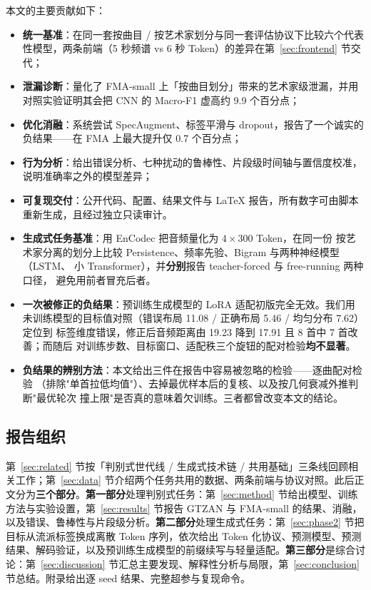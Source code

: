 \documentclass[UTF8,10pt,a4paper]{ctexart}
\begin{document}
本文的主要贡献如下：
\begin{itemize}
  \item \textbf{统一基准}：在同一套按曲目 / 按艺术家划分与同一套评估协议下比较六个代表性模型，两条前端（5 秒频谱 vs 6 秒 Token）的差异在第~\ref{sec:frontend} 节交代；
  \item \textbf{泄漏诊断}：量化了 FMA-small 上「按曲目划分」带来的艺术家级泄漏，并用对照实验证明其会把 CNN 的 Macro-F1 虚高约 9.9 个百分点；
  \item \textbf{优化消融}：系统尝试 SpecAugment、标签平滑与 dropout，报告了一个诚实的负结果——在 FMA 上最大提升仅 0.7 个百分点；
  \item \textbf{行为分析}：给出错误分析、七种扰动的鲁棒性、片段级时间轴与置信度校准，说明准确率之外的模型差异；
  \item \textbf{可复现交付}：公开代码、配置、结果文件与 LaTeX 报告，所有数字可由脚本重新生成，且经过独立只读审计。
  \item \textbf{生成式任务基准}：用 EnCodec 把音频量化为 $4\times300$ Token，在同一份
        按艺术家分离的划分上比较 Persistence、频率先验、Bigram 与两种神经模型（LSTM、
        小 Transformer），并\textbf{分别}报告 teacher-forced 与 free-running 两种口径，
        避免用前者冒充后者。
  \item \textbf{一次被修正的负结果}：预训练生成模型的 LoRA 适配初版完全无效。我们用
        未训练模型的目标值对照（错误布局 11.08 / 正确布局 5.46 / 均匀分布 7.62）定位到
        标签维度错误，修正后音频距离由 19.23 降到 17.91 且 8 首中 7 首改善；而随后
        对训练步数、目标窗口、适配秩三个旋钮的配对检验\textbf{均不显著}。
  \item \textbf{负结果的辨别方法}：本文给出三件在报告中容易被忽略的检验——逐曲配对检验
        （排除"单首拉低均值"）、去掉最优样本后的复核、以及按几何衰减外推判断"最优轮次
        撞上限"是否真的意味着欠训练。三者都曾改变本文的结论。
\end{itemize}

\subsection{报告组织}

第~\ref{sec:related} 节按「判别式世代线 / 生成式技术链 / 共用基础」三条线回顾相关工作；第~\ref{sec:data} 节介绍两个任务共用的数据、两条前端与协议对照。此后正文分为\textbf{三个部分}。\textbf{第一部分}处理判别式任务：第~\ref{sec:method} 节给出模型、训练方法与实验设置，第~\ref{sec:results} 节报告 GTZAN 与 FMA-small 的结果、消融，以及错误、鲁棒性与片段级分析。\textbf{第二部分}处理生成式任务：第~\ref{sec:phase2} 节把目标从流派标签换成离散 Token 序列，依次给出 Token 化协议、预测模型、预测结果、解码验证，以及预训练生成模型的前缀续写与轻量适配。\textbf{第三部分}是综合讨论：第~\ref{sec:discussion} 节汇总主要发现、解释性分析与局限，第~\ref{sec:conclusion} 节总结。附录给出逐 seed 结果、完整超参与复现命令。
\end{document}
